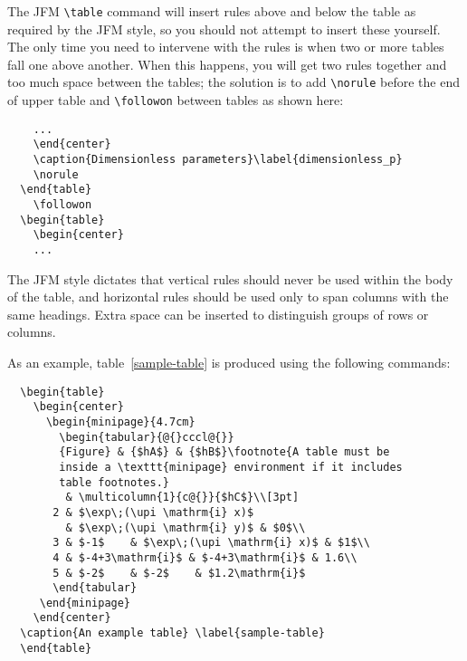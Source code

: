 \documentclass{jfm}
\providecommand\upi{\pi}%
\providecommand\upi{\pi}%
\begin{document}
The JFM \verb"\table" command will insert rules above and below
the table as required by the JFM style, so you should not attempt
to insert these yourself.
The only time you need to intervene with the rules is when two or more tables
fall one above another. When this happens, you will get two rules together
and too much space between the tables; the solution is to add \verb"\norule"
before the end of upper table and \verb"\followon" between tables as shown
here:
%
\begin{verbatim}
    ...
    \end{center}
    \caption{Dimensionless parameters}\label{dimensionless_p}
    \norule
  \end{table}
    \followon
  \begin{table}
    \begin{center}
    ...
\end{verbatim}

The JFM style dictates that vertical rules should never be used within the
body of the table, and horizontal rules should be used only to span
columns with the same headings. Extra space can be inserted to distinguish
groups of rows or columns.

As an example, table~\ref{sample-table} is produced using the following
commands:
%
\begin{verbatim}
  \begin{table}
    \begin{center}
      \begin{minipage}{4.7cm}
        \begin{tabular}{@{}cccl@{}}
        {Figure} & {$hA$} & {$hB$}\footnote{A table must be
        inside a \texttt{minipage} environment if it includes
        table footnotes.}
         & \multicolumn{1}{c@{}}{$hC$}\\[3pt]
       2 & $\exp\;(\upi \mathrm{i} x)$
         & $\exp\;(\upi \mathrm{i} y)$ & $0$\\
       3 & $-1$    & $\exp\;(\upi \mathrm{i} x)$ & $1$\\
       4 & $-4+3\mathrm{i}$ & $-4+3\mathrm{i}$ & 1.6\\
       5 & $-2$    & $-2$    & $1.2\mathrm{i}$
       \end{tabular}
     \end{minipage}
    \end{center}
  \caption{An example table} \label{sample-table}
  \end{table}
\end{verbatim}
\end{document}
